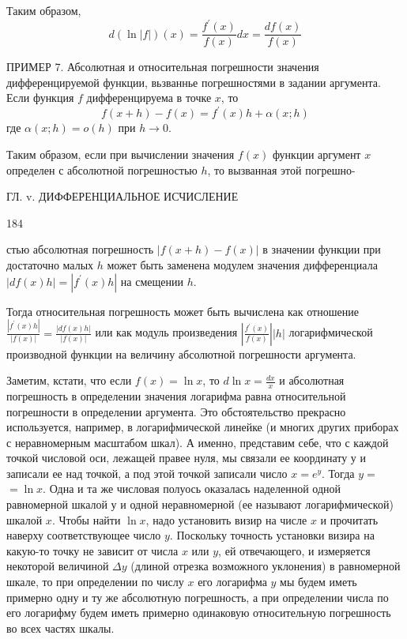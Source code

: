 \documentclass{article}
\begin{document}
Таким образом,
$$
d(\ln |f|)(x)=\frac{f^{\prime}(x)}{f(x)} d x=\frac{d f(x)}{f(x)}
$$

ПРИМЕР 7. Абсолютная и относительная погрешности значения дифференцируемой функции, вьзваннье погрешностями в задании аргумента. Если функция $f$ дифференцируема в точке $x$, то
$$
f(x+h)-f(x)=f^{\prime}(x) h+\alpha(x ; h)
$$
где $\alpha(x ; h)=o(h)$ при $h \rightarrow 0$.

Таким образом, если при вычислении значения $f(x)$ функции аргумент $x$ определен с абсолютной погрешностью $h$, то вызванная этой погрешно-


\newpage
\thispagestyle{empty}

\begin{scriptsize}ГЛ. v. ДИФФЕРЕНЦИАЛЬНОЕ ИСЧИСЛЕНИЕ  \end{scriptsize} \hfill 184

\bigskip
стью абсолютная погрешность $|f(x+h)-f(x)|$ в значении функции при достаточно малых $h$ может быть заменена модулем значения дифференциала $|d f(x) h|=\left|f^{\prime}(x) h\right|$ на смещении $h$.

Тогда относительная погрешность может быть вычислена как отношение $\frac{\left|f^{\prime}(x) h\right|}{|f(x)|}=\frac{|d f(x) h|}{|f(x)|}$ или как модуль произведения $\left|\frac{f^{\prime}(x)}{f(x)}\right||h|$ логарифмической производной функции на величину абсолютной погрешности аргумента.

Заметим, кстати, что если $f(x)=\ln x$, то $d \ln x=\frac{d x}{x}$ и абсолютная погрешность в определении значения логарифма равна относительной погрешности в определении аргумента. Это обстоятельство прекрасно используется, например, в логарифмической линейке (и многих других приборах с неравномерным масштабом шкал). А именно, представим себе, что с каждой точкой числовой оси, лежащей правее нуля, мы связали ее координату у и записали ее над точкой, а под этой точкой записали число $x=e^y$. Тогда $y=$ $=\ln x$. Одна и та же числовая полуось оказалась наделенной одной равномерной шкалой у и одной неравномерной (ее называют логарифмической) шкалой $x$. Чтобы найти $\ln x$, надо установить визир на числе $x$ и прочитать наверху соответствующее число $y$. Поскольку точность установки визира на какую-то точку не зависит от числа $x$ или $y$, ей отвечающего, и измеряется некоторой величиной $\Delta y$ (длиной отрезка возможного уклонения) в равномерной шкале, то при определении по числу $x$ его логарифма $y$ мы будем иметь примерно одну и ту же абсолютную погрешность, а при определении числа по его логарифму будем иметь примерно одинаковую относительную погрешность во всех частях шкалы.
\end{document}
